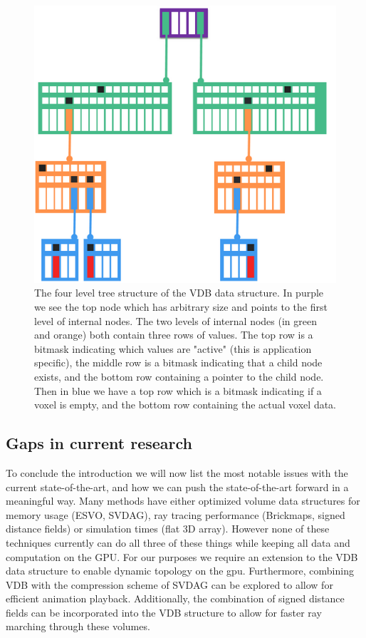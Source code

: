 \begin{figure}[H]
    \centering
    \includegraphics[width=0.9\linewidth]{figures/OpenVDB.png}
    \caption{The four level tree structure of the VDB data structure. In purple we see the top node which has arbitrary size and points to the first level of internal nodes. The two levels of internal nodes (in green and orange) both contain three rows of values. The top row is a bitmask indicating which values are "active" (this is application specific), the middle row is a bitmask indicating that a child node exists, and the bottom row containing a pointer to the child node. Then in blue we have a top row which is a bitmask indicating if a voxel is empty, and the bottom row containing the actual voxel data. \cite{museth2013vdb}}
    \label{fig:VDB}
\end{figure}

\subsection{Gaps in current research}\label{INTRO:GAPS}
To conclude the introduction we will now list the most notable issues with the current state-of-the-art, and how we can push the state-of-the-art forward in a meaningful way. Many methods have either optimized volume data structures for memory usage (ESVO, SVDAG), ray tracing performance (Brickmaps, signed distance fields) or simulation times (flat 3D array). However none of these techniques currently can do all three of these things while keeping all data and computation on the GPU. For our purposes we require an extension to the VDB data structure to enable dynamic topology on the gpu. Furthermore, combining VDB with the compression scheme of SVDAG can be explored to allow for efficient animation playback. Additionally, the combination of signed distance fields can be incorporated into the VDB structure to allow for faster ray marching through these volumes.